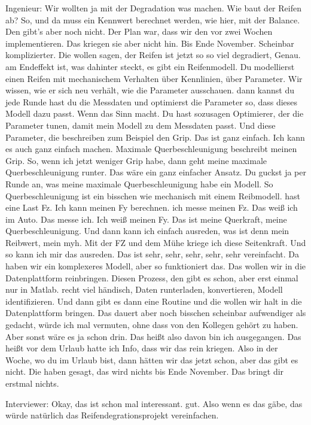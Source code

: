 Ingenieur: 
Wir wollten ja mit der Degradation was machen. Wie baut der Reifen ab? So, und da muss ein Kennwert berechnet werden, wie hier, mit der Balance. Den gibt's aber noch nicht. Der Plan war, dass wir den vor zwei Wochen implementieren. Das kriegen sie aber nicht hin. Bis Ende November. Scheinbar komplizierter. Die wollen sagen, der Reifen ist jetzt so so viel degradiert, Genau. am Endeffekt ist, was dahinter steckt, es gibt ein Reifenmodell.   Du modellierst einen Reifen mit mechanischem Verhalten über Kennlinien, über Parameter. Wir wissen, wie er sich neu verhält, wie die Parameter ausschauen. dann kannst du jede Runde hast du die Messdaten und optimierst die Parameter so, dass dieses Modell dazu passt. Wenn das Sinn macht.  Du hast sozusagen Optimierer, der die Parameter tunen, damit mein Modell zu dem Messdaten passt. Und diese Parameter, die beschreiben  zum Beispiel den Grip. Das ist ganz einfach. Ich kann es auch ganz einfach machen. Maximale Querbeschleunigung beschreibt meinen Grip. So, wenn ich jetzt weniger Grip habe, dann geht meine maximale Querbeschleunigung runter. Das wäre ein ganz einfacher Ansatz. Du guckst ja per Runde an, was meine maximale Querbeschleunigung habe ein Modell. So Querbeschleunigung ist ein bisschen wie mechanisch mit einem Reibmodell. hast eine Last Fz. Ich kann meinen Fy berechnen. ich messe meinen Fz. Das weiß ich im Auto.  Das messe ich. Ich weiß meinen Fy. Das ist meine Querkraft, meine Querbeschleunigung. Und dann kann ich einfach ausreden, was ist denn mein Reibwert, mein myh. Mit der FZ und dem Mühe kriege ich diese Seitenkraft. Und so kann ich mir das ausreden. Das ist sehr, sehr, sehr, sehr, sehr vereinfacht. Da haben wir ein komplexeres Modell, aber so funktioniert das. Das wollen wir in die Datenplattform reinbringen. Diesen Prozess, den gibt es schon, aber erst einmal nur in Matlab.  recht viel händisch, Daten runterladen, konvertieren, Modell identifizieren. Und dann gibt es dann eine Routine und die wollen wir halt in die Datenplattform bringen. Das dauert aber noch bisschen scheinbar aufwendiger als gedacht, würde ich mal vermuten, ohne dass von den Kollegen gehört zu haben. Aber sonst wäre es ja schon drin. Das heißt also davon bin ich ausgegangen. Das heißt vor dem Urlaub hatte ich  Info, dass wir das rein kriegen.  Also in der Woche, wo du im Urlaub bist, dann hätten wir das jetzt schon, aber das gibt es nicht.  Die haben gesagt, das wird nichts bis  Ende November. Das bringt dir erstmal nichts. 

Interviewer:
Okay, das ist schon mal interessant. gut. Also wenn es das gäbe, das würde natürlich das Reifendegrationsprojekt vereinfachen. 


